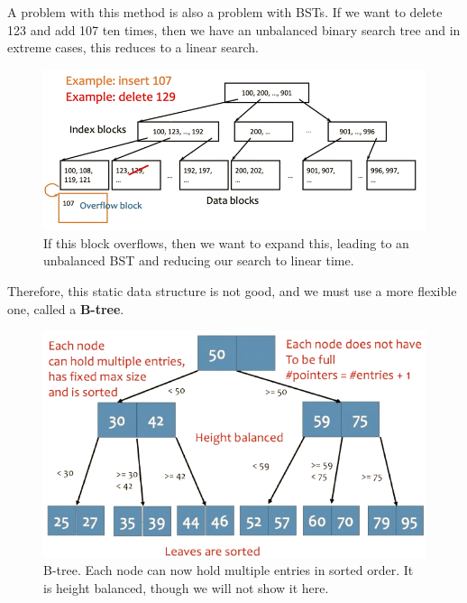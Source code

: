 \documentclass{article}
\begin{document}
      A problem with this method is also a problem with BSTs. If we want to delete 123 and add 107 ten times, then we have an unbalanced binary search tree and in extreme cases, this reduces to a linear search. 

      \begin{figure}[H]
        \centering 
        \includegraphics[scale=0.4]{img/isam_problem.png}
        \caption{If this block overflows, then we want to expand this, leading to an unbalanced BST and reducing our search to linear time.} 
        \label{fig:isam_problem}
      \end{figure}
      

      \begin{definition}[B Tree]
        Therefore, this static data structure is not good, and we must use a more flexible one, called a \textbf{B-tree}.
        \begin{figure}[H]
          \centering 
          \includegraphics[scale=0.4]{img/b_tree.png}
          \caption{B-tree. Each node can now hold multiple entries in sorted order. It is height balanced, though we will not show it here.} 
          \label{fig:b_tree}
        \end{figure}
      \end{definition}
\end{document}

